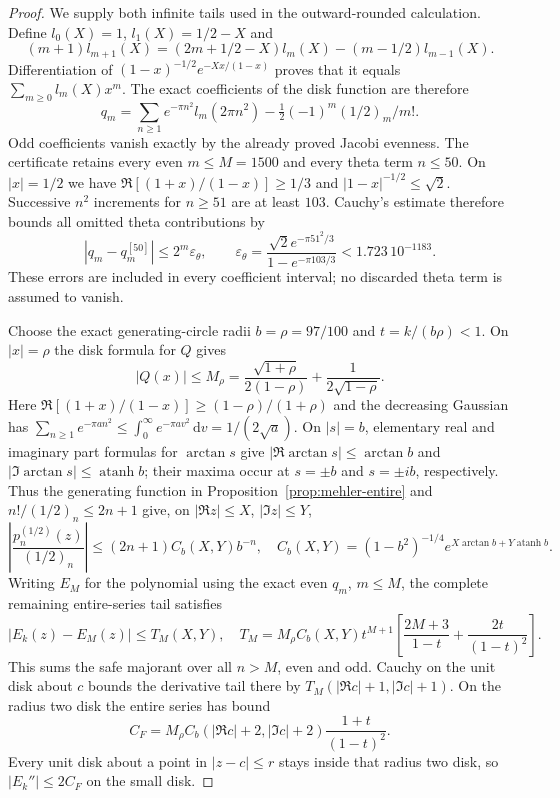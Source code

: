 \documentclass[11pt]{article}
\theoremstyle{remark}\newtheorem{remark}[theorem]{Remark}
\newcommand{\dd}{\,\mathrm d}
\begin{document}
\begin{proof}
We supply both infinite tails used in the outward-rounded calculation.
Define $l_0(X)=1$, $l_1(X)=1/2-X$ and
\[
 (m+1)l_{m+1}(X)=(2m+1/2-X)l_m(X)-(m-1/2)l_{m-1}(X).
\]
Differentiation of
$(1-x)^{-1/2}e^{-Xx/(1-x)}$ proves that it equals
$\sum_{m\ge0}l_m(X)x^m$. The exact coefficients of the disk function
are therefore
\[
 q_m=\sum_{n\ge1}e^{-\pi n^2}l_m(2\pi n^2)
                    -\tfrac12(-1)^m(1/2)_m/m!.
\]
Odd coefficients vanish exactly by the already proved Jacobi evenness.
The certificate retains every even $m\le M=1500$ and every theta
term $n\le50$. On $|x|=1/2$ we have
$\Re[(1+x)/(1-x)]\ge1/3$ and $|1-x|^{-1/2}\le\sqrt2$.
Successive $n^2$ increments for $n\ge51$ are at least $103$.
Cauchy's estimate therefore bounds all omitted theta contributions by
\[
 |q_m-q_m^{[50]}|\le2^m\varepsilon_\theta,\qquad
 \varepsilon_\theta=
 \frac{\sqrt2e^{-\pi51^2/3}}{1-e^{-\pi103/3}}
                                      <1.723\,10^{-1183}.
\]
These errors are included in every coefficient interval; no discarded
theta term is assumed to vanish.

Choose the exact generating-circle radii $b=\rho=97/100$ and
$t=k/(b\rho)<1$. On $|x|=\rho$ the disk formula for $Q$ gives
\[
 |Q(x)|\le M_\rho=
 \frac{\sqrt{1+\rho}}{2(1-\rho)}+\frac1{2\sqrt{1-\rho}}.
\]
Here $\Re[(1+x)/(1-x)]\ge(1-\rho)/(1+\rho)$ and the decreasing
Gaussian has $\sum_{n\ge1}e^{-\pi a n^2}\le
\int_0^\infty e^{-\pi a v^2}\dd v=1/(2\sqrt a)$.
On $|s|=b$, elementary real and imaginary part formulas for
$\arctan s$ give
$|\Re\arctan s|\le\arctan b$ and
$|\Im\arctan s|\le\operatorname{atanh}b$; their maxima occur at
$s=\pm b$ and $s=\pm ib$, respectively.
Thus the generating function in Proposition~\ref{prop:mehler-entire}
and $n!/(1/2)_n\le2n+1$ give, on
$|\Re z|\le X$, $|\Im z|\le Y$,
\[
 \left|\frac{p_n^{(1/2)}(z)}{(1/2)_n}\right|
 \le(2n+1)C_b(X,Y)b^{-n},\quad
 C_b(X,Y)=(1-b^2)^{-1/4}
                  e^{X\arctan b+Y\operatorname{atanh}b}.
\]
Writing $E_M$ for the polynomial using the exact even $q_m$, $m\le M$,
the complete remaining entire-series tail satisfies
\[
 |E_k(z)-E_M(z)|\le T_M(X,Y),\quad
 T_M=M_\rho C_b(X,Y)t^{M+1}
       \left[\frac{2M+3}{1-t}+\frac{2t}{(1-t)^2}\right].
\]
This sums the safe majorant over all $n>M$, even and odd. Cauchy on
the unit disk about $c$ bounds the derivative tail there by
$T_M(|\Re c|+1,|\Im c|+1)$. On the radius two disk the entire series
has bound
\[
 C_F=M_\rho C_b(|\Re c|+2,|\Im c|+2)\frac{1+t}{(1-t)^2}.
\]
Every unit disk about a point in $|z-c|\le r$ stays inside that
radius two disk, so $|E_k''|\le2C_F$ on the small disk.


\end{proof}
\end{document}

